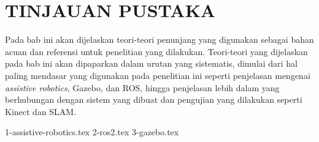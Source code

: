 \chapter{TINJAUAN PUSTAKA}
\label{chap:tinjauanpustaka}

Pada bab ini akan dijelaskan teori-teori penunjang yang digunakan sebagai bahan acuan dan referensi untuk penelitian yang dilakukan.
Teori-teori yang dijelaskan pada bab ini akan dipaparkan dalam urutan yang sistematis,
  dimulai dari hal paling mendasar yang digunakan pada penelitian ini seperti penjelasan mengenai \emph{assistive robotics}, Gazebo, dan ROS,
  hingga penjelasan lebih dalam yang berhubungan dengan sistem yang dibuat dan pengujian yang dilakukan seperti Kinect dan SLAM.

{1-assistive-robotics.tex}
{2-ros2.tex}
{3-gazebo.tex}
